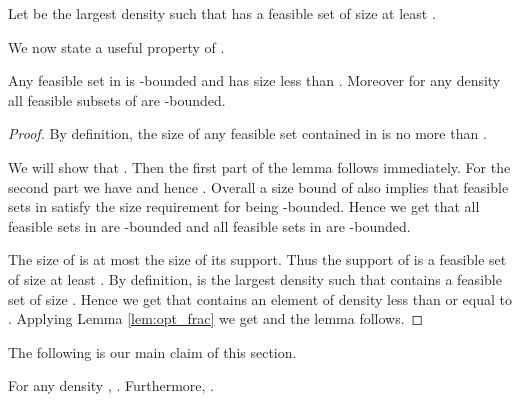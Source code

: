 \begin{definition}
Let  be the largest density such that  has a feasible set of size at least .
\end{definition}

\noindent
We now state a useful property of . 
\begin{lemma}
  \label{lem:rhoc-indep}
Any feasible set in  is -bounded and has size less than . Moreover for any density  all feasible subsets of  are -bounded. 
\end{lemma}

\begin{proof}
By definition, the size of any feasible set contained in  is no more than .

We will show that . Then the first part of the lemma
follows immediately. For the second part we have  and hence 
. Overall a size bound of  also implies that 
feasible sets in  satisfy the size requirement for being
-bounded. Hence we get that all feasible sets in  are -bounded and all feasible sets
in  are -bounded.

The size of  is at most the size of its support. Thus the
support of  is a feasible set of size at least . By
definition,  is the largest density such that 
contains a feasible set of size . Hence we get that 
contains an element of density less than or equal to . Applying
Lemma \ref{lem:opt_frac} we get  and the
lemma follows.
\end{proof}

\noindent
The following is our main claim of this section. 
\begin{lemma}
  \label{lem:goodprefix} 
For any density ,
. Furthermore, .
\end{lemma}

